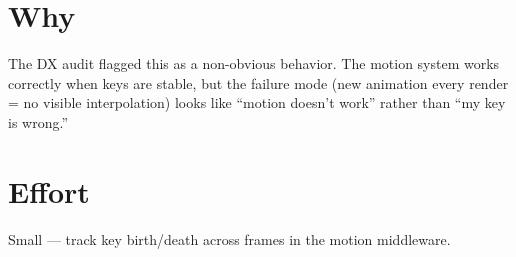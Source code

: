 \section{Why}\label{record-345-why}

The DX audit flagged this as a non-obvious behavior. The motion system works correctly when keys are stable, but the failure mode (new animation every render = no visible interpolation) looks like ``motion doesn't work'' rather than ``my key is wrong.''

\section{Effort}\label{record-345-effort}

Small --- track key birth/death across frames in the motion middleware.

